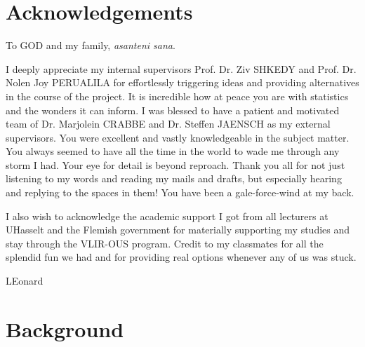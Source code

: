 \documentclass[11pt]{article}
\begin{document}
\section*{Acknowledgements}
\par{To GOD and my family, \textit{asanteni sana}.}
\par{I deeply appreciate my internal supervisors Prof. Dr. Ziv SHKEDY and Prof. Dr. Nolen Joy PERUALILA for effortlessly triggering ideas and providing alternatives in the course of the project. It is incredible how at peace you are with statistics and the wonders it can inform.  I was blessed to have a patient and motivated team of Dr. Marjolein CRABBE and Dr. Steffen JAENSCH as my external supervisors. You were excellent and vastly knowledgeable in the subject matter. You always seemed to have all the time in the world to wade me through any storm I had. Your eye for detail is beyond reproach.  Thank you all for not just listening to my words and reading my mails and drafts, but especially hearing and replying to the spaces in them! You have been a gale-force-wind at my back.}
\par{I also wish to acknowledge the academic support I got from all lecturers at UHasselt and the Flemish government for materially supporting my studies and stay through the VLIR-OUS program. Credit to my classmates for all the splendid fun we had and for providing real options whenever any of us was stuck.}
\begin{flushright}
LEonard
\end{flushright}
\clearpage
{}
\section{Background}
\end{document}
